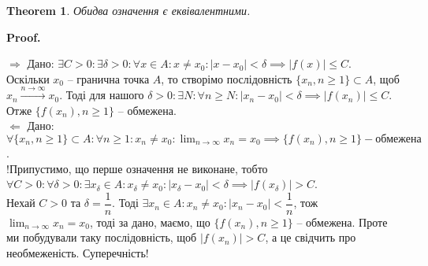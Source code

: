 \documentclass[a4paper, 14pt]{article}
\makeatletter
\def\qed{$\blacksquare$}
\def\rightproof{$\boxed{\Rightarrow}$ }
\def\leftproof{$\boxed{\Leftarrow}$ }
\theoremstyle{theoremdd}
\newtheorem{theorem}{Theorem}[subsection]
\theoremstyle{theoremdd}
\theoremstyle{theoremdd}
\theoremstyle{theoremdd}
\theoremstyle{theoremdd}
\theoremstyle{theoremdd}
\theoremstyle{theoremdd}
\theoremstyle{theoremdd}
\renewenvironment{proof}[1][Proof.\\]{\par
\pushQED{\hfill \qed}%
\normalfont \topsep6\p@\@plus6\p@\relax
\trivlist
\item\relax
{\bfseries
#1\@addpunct{.}}\hspace\labelsep\ignorespaces
}{%
\popQED\endtrivlist\@endpefalse
}
\makeatother
\begin{document}
	\begin{theorem}
	Обидва означення є еквівалентними.
	\end{theorem}
	
	\begin{proof}
	\rightproof Дано: $\exists C > 0: \exists \delta > 0: \forall x \in A: x \neq x_0: |x-x_0|<\delta \implies |f(x)| \leq C$.\\
	Оскільки $x_0$ -- гранична точка $A$, то створімо послідовність $\{x_n, n \geq 1\} \subset A$, щоб $x_n \overset{n \to \infty}{\longrightarrow} x_0$. Тоді для нашого $\delta > 0: \exists N: \forall n \geq N: |x_n-x_0|<\delta \implies |f(x_n)| \leq C$. Отже $\{f(x_n), n \geq 1\}$ -- обмежена.
	\bigskip \\
	\leftproof Дано: $\forall \{x_n, n \geq 1\} \subset A: \forall n \geq 1: x_n \neq x_0: \displaystyle \lim_{n \to \infty} x_n = x_0 \implies \{f(x_n), n \geq 1\} - \text{обмежена}$.\\
	!Припустимо, що перше означення не виконане, тобто \\ $\forall C > 0: \forall \delta > 0: \exists x_{\delta} \in A: x_{\delta} \neq x_0: |x_{\delta} - x_0| < \delta \implies |f(x_{\delta})| > C$.\\
	Нехай $C > 0$ та $\delta = \dfrac{1}{n}$. Тоді $\exists x_n \in A: x_n \neq x_0: |x_n-x_0|<\dfrac{1}{n}$, тож $\displaystyle\lim_{n \to \infty} x_n = x_0$, тоді за дано, маємо, що $\{f(x_n), n \geq 1\}$ -- обмежена. Проте ми побудували таку послідовність, щоб $|f(x_n)| > C$, а це свідчить про необмеженість. Суперечність!
	\end{proof}
	
\end{document}
